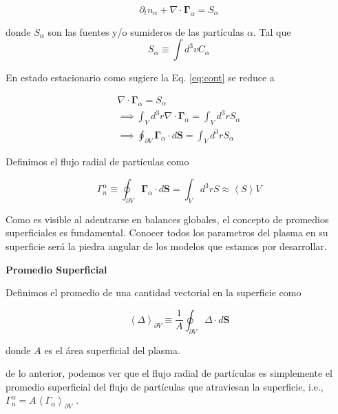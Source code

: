   \begin{equation}\label{eq:cont}
    \partial_t n_\alpha + \nabla\cdot\pmb{\Gamma}_\alpha = S_\alpha
  \end{equation}

  donde $S_\alpha$ son las fuentes y/o sumideros de las part\'iculas $\alpha$. Tal que 
  \begin{equation}
    S_\alpha \equiv \int d^3v C_\alpha
  \end{equation}
  
  En estado estacionario como sugiere \cite{lechte2002} la Eq. \eqref{eq:cont} se reduce a 

  \begin{eqnarray*}
    \nabla\cdot\pmb{\Gamma}_\alpha = S_\alpha \\
    \implies \int_V d^3r\nabla\cdot\pmb{\Gamma}_\alpha = \int_V d^3r S_\alpha\\
    \implies \oint_{\partial V} \pmb{\Gamma}_\alpha\cdot d\textbf{S} = \int_V d^3r S_\alpha
  \end{eqnarray*}

  Definimos el flujo radial de part\'iculas como

  \begin{equation}\label{eq:rtpf}
    \Gamma_n^\alpha \equiv \oint_{\partial V} \pmb{\Gamma}_\alpha \cdot d\textbf{S} = \int_V d^3r S \approx \left<S\right>V
  \end{equation}

  Como es visible al adentrarse en balances globales, el concepto de promedios superficiales es fundamental. Conocer todos los parametros del plasma en su superficie ser\'a la piedra angular de los modelos que estamos por desarrollar.

  \begin{shaded}
    \textbf{Promedio Superficial}

    Definimos el promedio de una cantidad vectorial en la superficie como 

    \begin{equation}
      \left<\pmb{\varDelta}\right>_{\partial V} \equiv \frac{1}{A}\oint_{\partial V}\pmb{\varDelta}\cdot d\textbf{S}
    \end{equation}

    donde $A$ es el \'area superficial del plasma.
  \end{shaded}

  de lo anterior, podemos ver que el flujo radial de part\'iculas es simplemente el promedio superficial del flujo de part\'iculas que atraviesan la superficie, i.e., $\Gamma_n^\alpha = A\left<\Gamma_\alpha\right>_{\partial V}$ \cite{dinklage2005}.
  
